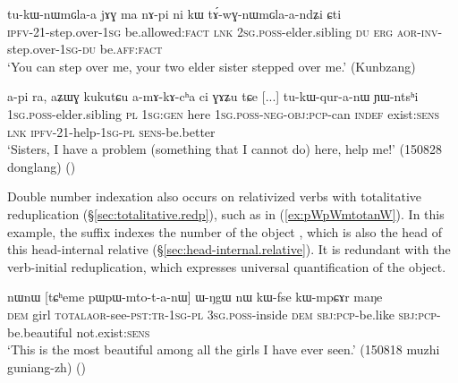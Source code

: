 \begin{exe}
\ex   \label{ex:tAwGnWmGlaandZi}
\gll tu-kɯ-nɯmɢla-a jɤɣ ma nɤ-pi ni kɯ tɤ́-wɣ-nɯmɢla-a-ndʑi ɕti \\
\textsc{ipfv}-2\fl{}1-step.over-\textsc{1sg} be.allowed:\textsc{fact} \textsc{lnk} \textsc{2sg}.\textsc{poss}-elder.sibling \textsc{du} \textsc{erg} \textsc{aor}-\textsc{inv}-step.over-\textsc{1sg}-\textsc{du} be.\textsc{aff}:\textsc{fact} \\
\glt `You can step over me, your two elder sister stepped over me.' (Kunbzang)
\end{exe}

\begin{exe}
\ex   \label{ex:tukWquranW.YWntshi}
\gll  a-pi ra, aʑɯɣ kukutɕu a-mɤ-kɤ-cʰa ci ɣɤʑu tɕe [...] tu-kɯ-qur-a-nɯ ɲɯ-ntsʰi \\
\textsc{1sg}.\textsc{poss}-elder.sibling \textsc{pl} \textsc{1sg}:\textsc{gen} here \textsc{1sg}.\textsc{poss}-\textsc{neg}-\textsc{obj}:\textsc{pcp}-can \textsc{indef} exist:\textsc{sens} \textsc{lnk} { } \textsc{ipfv}-2\fl{}1-help-\textsc{1sg}-\textsc{pl} \textsc{sens}-be.better \\
\glt `Sisters, I have a problem (something that I cannot do) here, help me!' (150828 donglang)
()
\end{exe}

Double number indexation also occurs on relativized verbs with totalitative reduplication (§\ref{sec:totalitative.redp}),  such as  in (\ref{ex:pWpWmtotanW}). In this example, the suffix  indexes the number of the object , which is also the head of this head-internal relative (§\ref{sec:head-internal.relative}). It is redundant with the verb-initial reduplication, which expresses universal quantification of the object.

\begin{exe}
\ex   \label{ex:pWpWmtotanW}
\gll nɯnɯ [tɕʰeme pɯ\redp{}pɯ-mto-t-a-nɯ] ɯ-ŋgɯ nɯ kɯ-fse kɯ-mpɕɤr maŋe \\
\textsc{dem} girl \textsc{total}\redp{}\textsc{aor}-see-\textsc{pst}:\textsc{tr}-\textsc{1sg}-\textsc{pl} \textsc{3sg}.\textsc{poss}-inside \textsc{dem} \textsc{sbj}:\textsc{pcp}-be.like \textsc{sbj}:\textsc{pcp}-be.beautiful not.exist:\textsc{sens} \\
\glt `This is the most beautiful among all the girls I have ever seen.' (150818 muzhi guniang-zh)
()
\end{exe}


